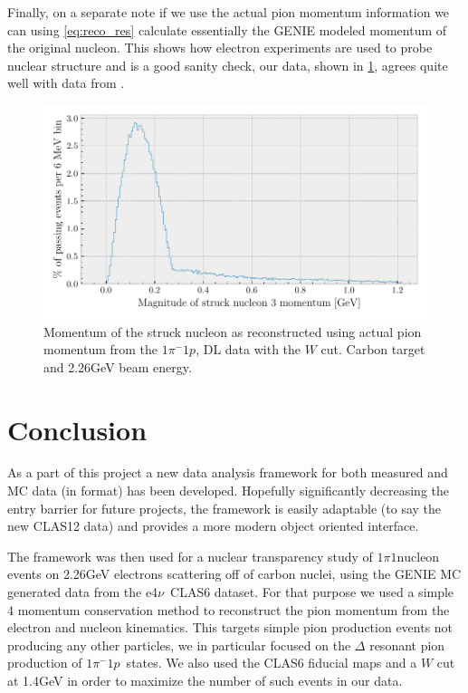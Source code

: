 \documentclass[a4paper,12pt]{article}
\newcommand{\efn}{e4$\nu$}
\newcommand{\verbb}[1]{\text{\Verb|#1|}}
\newcommand{\md}{$1\pi^-1p$}
\begin{document}
Finally, on a separate note if we use the actual pion momentum information we can using \cref{eq:reco_res} calculate essentially the GENIE modeled momentum of the original nucleon.
This shows how electron experiments are used to probe nuclear structure and is a good sanity check, our data, shown in \cref{fig:nuc_str1}, agrees quite well with data from \cite{luMeasurementNuclearEffects2016a}.

\begin{figure}[H]
    \centering
    \includegraphics{figures/python/nuc_str1.pdf}
    \caption{
        Momentum of the struck nucleon as reconstructed using actual pion momentum from the \md, DL data with the $W$ cut.
        Carbon target and 2.26\si{GeV} beam energy.
    }\label{fig:nuc_str1}
\end{figure}

\section{Conclusion}
As a part of this project a new data analysis framework for both measured and MC data (in \verbb{gst} format) has been developed.
Hopefully significantly decreasing the entry barrier for future projects, the framework is easily adaptable (to say the new CLAS12 data) and provides a more modern object oriented interface.

The framework was then used for a nuclear transparency study of $1\pi1\text{nucleon}$ events on 2.26\si{GeV} electrons scattering off of carbon nuclei, using the GENIE MC generated data from the \efn\ CLAS6 dataset.
For that purpose we used a simple 4 momentum conservation method to reconstruct the pion momentum from the electron and nucleon kinematics.
This targets simple pion production events not producing any other particles, we in particular focused on the $\Delta$ resonant pion production of \md\ states.
We also used the CLAS6 fiducial maps and a $W$ cut at 1.4\si{GeV} in order to maximize the number of such events in our data.
\end{document}
